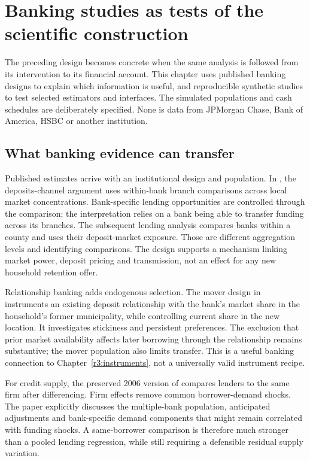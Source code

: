 \chapter{Banking studies as tests of the scientific construction}
\label{r3:banking-studies}

The preceding design becomes concrete when the same analysis is followed
from its intervention to its financial account. This chapter uses published
banking designs to explain which information is useful, and reproducible
synthetic studies to test selected estimators and interfaces. The simulated
populations and cash schedules are deliberately specified. None is data
from JPMorgan Chase, Bank of America, HSBC or another institution.

\section{What banking evidence can transfer}
\label{r3:banking-evidence}

Published estimates arrive with an institutional design and population.
In \citet[printed pp.2--4]{drechsler2017}, the deposits-channel argument
uses within-bank branch comparisons across local market concentrations.
Bank-specific lending opportunities are controlled through the comparison;
the interpretation relies on a bank being able to transfer funding across
its branches. The subsequent lending analysis compares banks within a
county and uses their deposit-market exposure. Those are different
aggregation levels and identifying comparisons. The design supports a
mechanism linking market power, deposit pricing and transmission, not
an effect for any new household retention offer.

Relationship banking adds endogenous selection. The mover design in
\citet[Section 4.2.1, equations (6)--(8)]{basten2026} instruments an
existing deposit relationship with the bank's market share in the
household's former municipality, while controlling current share in
the new location. It investigates stickiness and persistent preferences.
The exclusion that prior market availability affects later borrowing
through the relationship remains substantive; the mover population
also limits transfer. This is a useful banking connection to
Chapter~\ref{r3:instruments}, not a universally valid instrument recipe.

For credit supply, the preserved 2006 version of
\citet[Section III.B, equation (5)]{mian2006} compares lenders to the same
firm after differencing. Firm effects remove common borrower-demand
shocks. The paper explicitly discusses the multiple-bank population,
anticipated adjustments and bank-specific demand components that might
remain correlated with funding shocks. A same-borrower comparison is
therefore much stronger than a pooled lending regression, while still
requiring a defensible residual supply variation.


